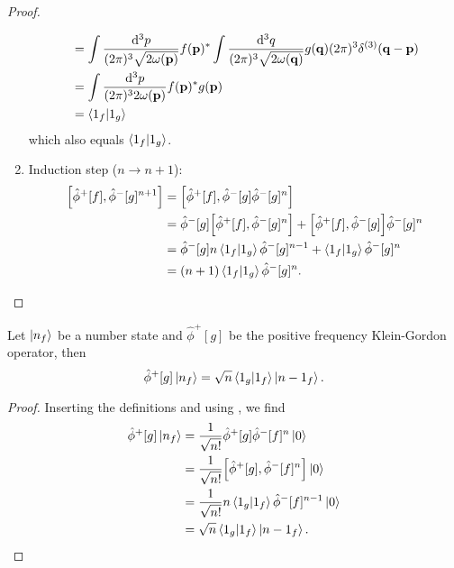 \begin{proof}
\begin{enumerate}
\begin{equation*}
\begin{split}
				&=
				\int\frac{\dd[3]{p}}{(2\pi)^3\sqrt{2\omega(\vb{p})}}
				f(\vb{p})^*
				\int\frac{\dd[3]{q}}{(2\pi)^3\sqrt{2\omega(\vb{q})}}
				g(\vb{q})
				(2\pi)^3\delta^{(3)}(\vb{q}-\vb{p})
				\\
				&=
				\int\frac{\dd[3]{p}}{(2\pi)^32\omega(\vb{p})}
				f(\vb{p})^*
				g(\vb{p})
				\\
				&=
				\braket{1_f}{1_g}
			\end{split}
		\end{equation*}
		which also equals $\braket{1_f}{1_g}$.
		\item Induction step ($n\to n+1$):
		\begin{equation*}
			\begin{split}
				\comm{\hat\phi^+[f]}{\hat\phi^-[g]^{n+1}}
				&=
				\comm{\hat\phi^+[f]}{\hat\phi^-[g]\hat\phi^-[g]^n}
				\\
				&=
				\hat\phi^-[g]
				\comm{\hat\phi^+[f]}{\hat\phi^-[g]^n}
				+
				\comm{\hat\phi^+[f]}{\hat\phi^-[g]}
				\hat\phi^-[g]^n
				\\
				&=
				\hat\phi^-[g]
				n\braket{1_f}{1_g}
				\hat\phi^-[g]^{n-1}
				+
				\braket{1_f}{1_g}
				\hat\phi^-[g]^n
				\\
				&=
				(n+1)
				\braket{1_f}{1_g}
				\hat\phi^-[g]^n
				.
			\end{split}
		\end{equation*}
	\end{enumerate}
\end{proof}

\begin{lemma}\label{thm:qkg_smeared_pos}
	Let $\ket{n_f}$ be a number state and $\hat\phi^+[g]$ be the positive frequency Klein-Gordon operator, then
	\begin{equation}
		\hat\phi^+[g]
		\ket{n_f}
		=
		\sqrt{n}
		\braket{1_g}{1_f}
		\ket{n-1_f}
		.
	\end{equation}
\end{lemma}
\begin{proof}
	Inserting the definitions and using , we find
	\begin{equation*}
		\begin{split}
			\hat\phi^+[g]
			\ket{n_f}
			&=
			\frac{1}{\sqrt{n!}}
			\hat\phi^+[g]
			\hat\phi^-[f]^n
			\ket{0}
			\\
			&=
			\frac{1}{\sqrt{n!}}
			\comm{\hat\phi^+[g]}{\hat\phi^-[f]^n}
			\ket{0}
			\\
			&=
			\frac{1}{\sqrt{n!}}
			n
			\braket{1_g}{1_f}
			\hat\phi^-[f]^{n-1}
			\ket{0}
			\\
			&=
			\sqrt{n}
			\braket{1_g}{1_f}
			\ket{n-1_f}
			.
		\end{split}
	\end{equation*}
\end{proof}

